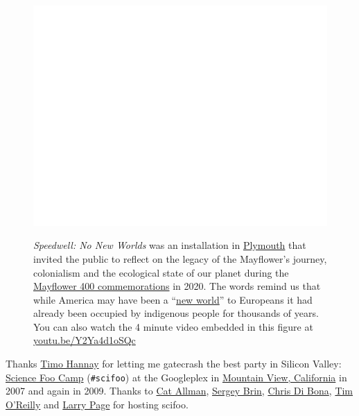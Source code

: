 \documentclass[
]{book}
\begin{document}
\begin{figure}

{\centering \href{https://www.youtube.com/embed/Y2Ya4d1oSQc}{\includegraphics[width=0.99\linewidth]{cdyf_files/figure-latex/neworld-fig-1} }

}

\caption{\emph{Speedwell: No New Worlds} was an installation in \href{https://en.wikipedia.org/wiki/Plymouth}{Plymouth} that invited the public to reflect on the legacy of the Mayflower's journey, colonialism and the ecological state of our planet during the \href{https://www.mayflower400uk.org/}{Mayflower 400 commemorations} in 2020. The words remind us that while America may have been a ``\href{https://en.wikipedia.org/wiki/New_World}{new world}'' to Europeans it had already been occupied by indigenous people for thousands of years. \citep{speedwell1} You can also watch the 4 minute video embedded in this figure at \href{https://youtu.be/Y2Ya4d1oSQc}{youtu.be/Y2Ya4d1oSQc} \citep{speedwell2}}\label{fig:neworld-fig}
\end{figure}



Thanks \href{https://en.wikipedia.org/wiki/Timo_Hannay}{Timo Hannay} for letting me gatecrash the best party in Silicon Valley: \href{https://en.wikipedia.org/wiki/Science_Foo_Camp}{Science Foo Camp} (\texttt{\#scifoo}) at the Googleplex in \href{https://en.wikipedia.org/wiki/Mountain_View,_California}{Mountain View, California} in 2007 and again in 2009. Thanks to \href{https://en.wikipedia.org/wiki/Cat_Allman}{Cat Allman}, \href{https://en.wikipedia.org/wiki/Sergey_Brin}{Sergey Brin}, \href{https://en.wikipedia.org/wiki/Chris_DiBona}{Chris Di Bona}, \href{https://en.wikipedia.org/wiki/Tim_O\%27Reilly}{Tim O'Reilly} and \href{https://en.wikipedia.org/wiki/Larry_Page}{Larry Page} for hosting scifoo. \citep{scifoo2007, scifoo2009}
\end{document}
